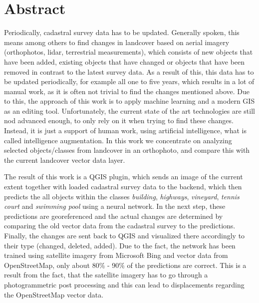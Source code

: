 \cleardoublepage
\markleft{\abstractname}

\chapter*{Abstract}
Periodically, cadastral survey data has to be updated. Generally spoken, this means among others to find changes in landcover based on aerial imagery (orthophotos, lidar, terrestrial measurements), which consists of new objects that have been added, existing objects that have changed or objects that have been removed in contrast to the latest survey data. As a result of this, this data has to be updated periodically, for example all one to five years, which results in a lot of manual work, as it is often not trivial to find the changes mentioned above. Due to this, the approach of this work is to apply machine learning and a modern GIS as an editing tool. Unfortunately, the current state of the art technologies are still nod advanced enough, to only rely on it when trying to find these changes. Instead, it is just a support of human work, using artificial intelligence, what is called intelligence augmentation. In this work we concentrate on analyzing selected objects/classes from landcover in an orthophoto, and compare this with the current landcover vector data layer.

The result of this work is a QGIS plugin, which sends an image of the current extent together with loaded cadastral survey data to the backend, which then predicts the all objects within the classes \textit{building}, \textit{highways}, \textit{vineyard}, \textit{tennis court} and \textit{swimming pool} using a neural network. In the next step, these predictions are georeferenced and the actual changes are determined by comparing the old vector data from the cadastral survey to the predictions. Finally, the changes are sent back to QGIS and visualized there accordingly to their type (changed, deleted, added). Due to the fact, the network has been trained using satellite imagery from Microsoft Bing and vector data from OpenStreetMap, only about 80\% - 90\% of the predictions are correct. This is a result from the fact, that the satellite imagery has to go through a photogrammetric post processing and this can lead to displacements regarding the OpenStreetMap vector data.